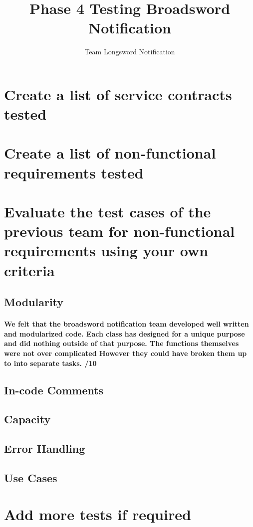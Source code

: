 \documentclass[11pt]{article}
\author{Team Longsword Notification}
\title{Phase 4 Testing Broadsword Notification}
\begin{document}
	\setlength{\parskip}{6pt}
	
	
	
	\tableofcontents
	
	\newpage
	
	
	\section{Create a list of service contracts tested}
	\section{Create a list of non-functional requirements tested}
	\section{Evaluate the test cases of the previous team for non-functional requirements using your own criteria}	
		\subsection{Modularity}
			\paragraph{We felt that the broadsword notification team developed well written and modularized code. Each class has designed for a unique purpose and did nothing outside of that purpose. The functions themselves were not over complicated However they could have broken them up to into separate tasks.  /10}
		\subsection{In-code Comments}
			\paragraph{}
		\subsection{Capacity}
			\paragraph{}
		\subsection{Error Handling}
			\paragraph{}
		\subsection{Use Cases}
			\paragraph{}
	\section{Add more tests if required}


	
	
\end{document}
